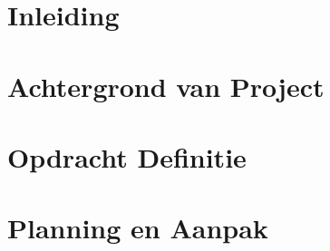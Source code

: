 \documentclass{../local}
\begin{document}
\chapter{Inleiding}

\newpage\null\thispagestyle{empty}

\renewcommand{\thesection}{\arabic{section}}

\renewcommand*\contentsname{Inhoud}
\thispagestyle{empty}
\setcounter{page}{0}
\tableofcontents
\clearpage

\chapter{Achtergrond van Project} 


\chapter{Opdracht Definitie}


\chapter{Planning en Aanpak}




\end{document}
